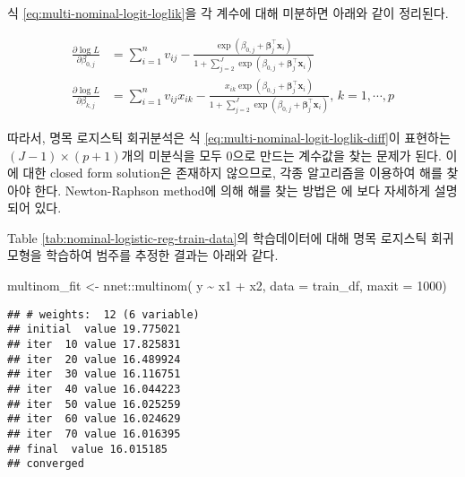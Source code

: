 \documentclass[
]{book}
\newenvironment{Shaded}{\begin{snugshade}}{\end{snugshade}}
\newcommand{\AttributeTok}[1]{\textcolor[rgb]{0.77,0.63,0.00}{#1}}
\newcommand{\DecValTok}[1]{\textcolor[rgb]{0.00,0.00,0.81}{#1}}
\newcommand{\FunctionTok}[1]{\textcolor[rgb]{0.00,0.00,0.00}{#1}}
\newcommand{\NormalTok}[1]{#1}
\newcommand{\OtherTok}[1]{\textcolor[rgb]{0.56,0.35,0.01}{#1}}
\newcommand{\SpecialCharTok}[1]{\textcolor[rgb]{0.00,0.00,0.00}{#1}}
\begin{document}
식 \eqref{eq:multi-nominal-logit-loglik}을 각 계수에 대해 미분하면 아래와 같이 정리된다.

\begin{equation}
\begin{split}
\frac{\partial \log L}{\partial \beta_{0,j}} &= \sum_{i = 1}^{n} v_{ij} - \frac{\exp \left( \beta_{0,j} + \boldsymbol\beta_{j}^\top \mathbf{x}_i \right)}{1 + \sum_{j = 2}^{J} \exp \left( \beta_{0,j} + \boldsymbol\beta_{j}^\top \mathbf{x}_i \right)}\\
\frac{\partial \log L}{\partial \beta_{k,j}} &= \sum_{i = 1}^{n} v_{ij} x_{ik} - \frac{x_{ik} \exp \left( \beta_{0,j} + \boldsymbol\beta_{j}^\top \mathbf{x}_i \right)}{1 + \sum_{j = 2}^{J} \exp \left( \beta_{0,j} + \boldsymbol\beta_{j}^\top \mathbf{x}_i \right)}, \, k = 1, \cdots, p
\end{split}
\label{eq:multi-nominal-logit-loglik-diff}
\end{equation}

따라서, 명목 로지스틱 회귀분석은 식 \eqref{eq:multi-nominal-logit-loglik-diff}이 표현하는 \((J - 1) \times (p + 1)\)개의 미분식을 모두 0으로 만드는 계수값을 찾는 문제가 된다. 이에 대한 closed form solution은 존재하지 않으므로, 각종 알고리즘을 이용하여 해를 찾아야 한다. Newton-Raphson method에 의해 해를 찾는 방법은 \citet{czepiel2002maximum} 에 보다 자세하게 설명되어 있다.

Table \ref{tab:nominal-logistic-reg-train-data}의 학습데이터에 대해 명목 로지스틱 회귀모형을 학습하여 범주를 추정한 결과는 아래와 같다.

\begin{Shaded}
\begin{Highlighting}[]
\NormalTok{multinom\_fit }\OtherTok{\textless{}{-}}\NormalTok{ nnet}\SpecialCharTok{::}\FunctionTok{multinom}\NormalTok{(}
\NormalTok{  y }\SpecialCharTok{\textasciitilde{}}\NormalTok{ x1 }\SpecialCharTok{+}\NormalTok{ x2, }
  \AttributeTok{data =}\NormalTok{ train\_df, }
  \AttributeTok{maxit =} \DecValTok{1000}\NormalTok{)}
\end{Highlighting}
\end{Shaded}

\begin{verbatim}
## # weights:  12 (6 variable)
## initial  value 19.775021 
## iter  10 value 17.825831
## iter  20 value 16.489924
## iter  30 value 16.116751
## iter  40 value 16.044223
## iter  50 value 16.025259
## iter  60 value 16.024629
## iter  70 value 16.016395
## final  value 16.015185 
## converged
\end{verbatim}
\end{document}
